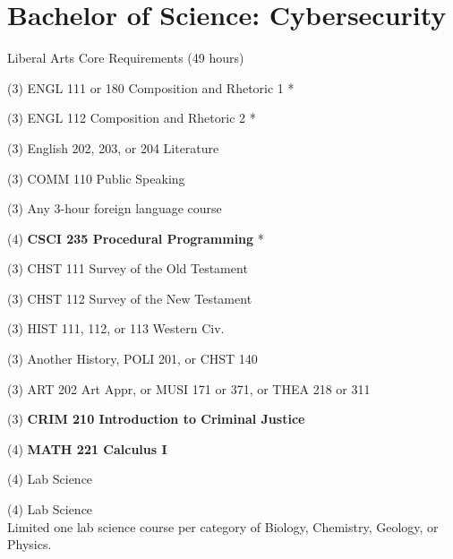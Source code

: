 %
\section*{Bachelor of Science: Cybersecurity}

\begin{reqgroup}{Liberal Arts Core Requirements (49 hours)}
\begin{checklist}
\begin{minipage}[t]{0.5\linewidth}
	\item (3) ENGL 111 or 180 Composition and Rhetoric 1 *
	\item (3) ENGL 112 Composition and Rhetoric 2 *
	\item (3) English 202, 203, or 204 Literature
	\item (3) COMM 110 Public Speaking
	\item (3) Any 3-hour foreign language course
	\item (4) \textbf{CSCI 235  Procedural Programming} *
	\item (3) CHST 111  Survey of the Old Testament
	\item (3) CHST 112  Survey of the New Testament
	\item (3) HIST 111, 112, or 113 Western Civ.
\end{minipage}
\begin{minipage}[t]{0.5\linewidth}
	\item (3) Another History, POLI 201, or CHST 140
	\item (3) ART 202 Art Appr, or MUSI 171 or 371, or THEA 218 or 311
	\item (3) \textbf{CRIM 210 Introduction to Criminal Justice}
	\item (4) \textbf{MATH 221 Calculus I}
	\item (4) Lab Science
	\item (4) Lab Science\\Limited one lab science course per category of Biology, Chemistry,
Geology, or Physics.
\end{minipage}
\end{checklist}
\end{reqgroup}


